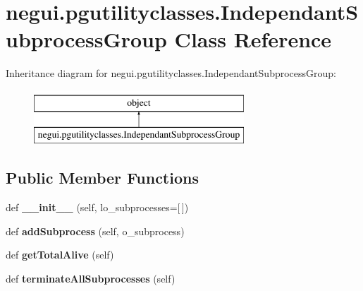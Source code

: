 \hypertarget{classnegui_1_1pgutilityclasses_1_1IndependantSubprocessGroup}{}\section{negui.\+pgutilityclasses.\+Independant\+Subprocess\+Group Class Reference}
\label{classnegui_1_1pgutilityclasses_1_1IndependantSubprocessGroup}
Inheritance diagram for negui.\+pgutilityclasses.\+Independant\+Subprocess\+Group\+:\begin{figure}[H]
\begin{center}
\leavevmode
\includegraphics[height=2.000000cm]{classnegui_1_1pgutilityclasses_1_1IndependantSubprocessGroup}
\end{center}
\end{figure}
\subsection*{Public Member Functions}
\begin{DoxyCompactItemize}
\item 
def {\bfseries \+\_\+\+\_\+init\+\_\+\+\_\+} (self, lo\+\_\+subprocesses=\mbox{[}$\,$\mbox{]})\hypertarget{classnegui_1_1pgutilityclasses_1_1IndependantSubprocessGroup_ab847e4373b27ae8580a3036c6b91ee01}{}\label{classnegui_1_1pgutilityclasses_1_1IndependantSubprocessGroup_ab847e4373b27ae8580a3036c6b91ee01}

\item 
def {\bfseries add\+Subprocess} (self, o\+\_\+subprocess)\hypertarget{classnegui_1_1pgutilityclasses_1_1IndependantSubprocessGroup_afae1c628e1a6e7e719148864aeb9fb44}{}\label{classnegui_1_1pgutilityclasses_1_1IndependantSubprocessGroup_afae1c628e1a6e7e719148864aeb9fb44}

\item 
def {\bfseries get\+Total\+Alive} (self)\hypertarget{classnegui_1_1pgutilityclasses_1_1IndependantSubprocessGroup_ae0b95298715c71ad27fbb50a5c96cdc9}{}\label{classnegui_1_1pgutilityclasses_1_1IndependantSubprocessGroup_ae0b95298715c71ad27fbb50a5c96cdc9}

\item 
def {\bfseries terminate\+All\+Subprocesses} (self)\hypertarget{classnegui_1_1pgutilityclasses_1_1IndependantSubprocessGroup_a9a9608d560b556d3ea8635832ca7bf87}{}\label{classnegui_1_1pgutilityclasses_1_1IndependantSubprocessGroup_a9a9608d560b556d3ea8635832ca7bf87}

\end{DoxyCompactItemize}


